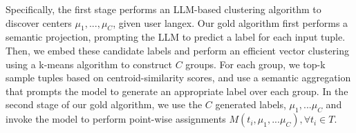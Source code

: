 Specifically, the first stage performs an LLM-based clustering algorithm to discover centers $\mu_1, ..., \mu_C$, given user langex. Our gold algorithm first performs a semantic projection, prompting the LLM to predict a label for each input tuple. Then, we embed these candidate labels and perform an efficient vector clustering using a k-means algorithm to construct $C$ groups. For each group, we top-k sample tuples based on centroid-similarity scores, and use a semantic aggregation that prompts the model to generate an appropriate label over each group. In the second stage of our gold algorithm, we use the $C$ generated labels, $\mu_1, ...\mu_C$ and invoke the model to perform point-wise assignments $M(t_i, \mu_1, ...\mu_C), \forall t_i\in T$.  

   















